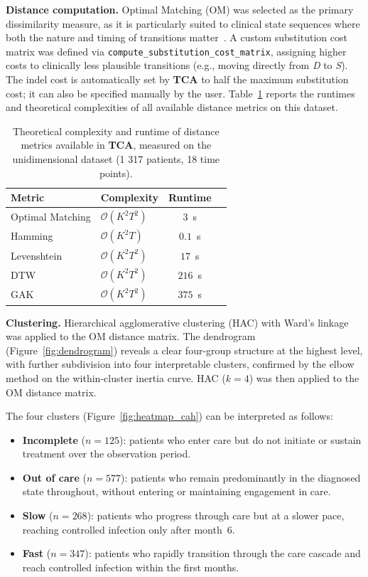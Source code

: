 \documentclass[pdflatex,sn-mathphys-num,referee,lineno]{sn-jnl}
\newcommand{\code}[1]{\texttt{#1}}
\newcommand{\pkg}[1]{\textbf{#1}}
\begin{document}
\textbf{Distance computation.}
Optimal Matching (OM) was selected as the primary dissimilarity measure, as it is particularly suited to clinical state sequences where both the nature and timing of transitions matter~\cite{andjohn1986optimal}.
A custom substitution cost matrix was defined via \code{compute\_substitution\_cost\_matrix}, assigning higher costs to clinically less plausible transitions (e.g., moving directly from \textit{D} to \textit{S}).
The indel cost is automatically set by \pkg{TCA} to half the maximum substitution cost; it can also be specified manually by the user.
Table~\ref{tab:runtimes} reports the runtimes and theoretical complexities of all available distance metrics on this dataset.

\begin{table}[htbp]
\centering
\caption{Theoretical complexity and runtime  of distance metrics available in \pkg{TCA}, measured on the unidimensional dataset (1 317 patients, 18 time points).}
\label{tab:runtimes}
\begin{tabular}{llcc}
\hline
\textbf{Metric} & \textbf{Complexity} & \textbf{Runtime} \\
\hline
Optimal Matching & $\mathcal{O}(K^2 T^2)$ & $3$~s \\
Hamming & $\mathcal{O}(K^2 T)$ &  $0.1$~s  \\
Levenshtein & $\mathcal{O}(K^2 T^2)$ & $17$~s \\
DTW & $\mathcal{O}(K^2 T^2)$ & $216$~s \\
GAK & $\mathcal{O}(K^2 T^2)$ & $375$~s \\
\hline
\end{tabular}
\end{table}

\FloatBarrier

\textbf{Clustering.}
Hierarchical agglomerative clustering (HAC) with Ward's linkage was applied to the OM distance matrix.
The dendrogram (Figure~\ref{fig:dendrogram}) reveals a clear four-group structure at the highest level, with further subdivision into four interpretable clusters, confirmed by the elbow method on the within-cluster inertia curve.
HAC ($k = 4$) was then applied to the OM distance matrix.

The four clusters (Figure~\ref{fig:heatmap_cah}) can be interpreted as follows:

\begin{itemize}
    \item \textbf{Incomplete} ($n = 125$): patients who enter care but do not initiate or sustain treatment over the observation period.
    \item \textbf{Out of care} ($n = 577$): patients who remain predominantly in the diagnosed state throughout, without entering or maintaining engagement in care.
    \item \textbf{Slow} ($n = 268$): patients who progress through care but at a slower pace, reaching controlled infection only after month~6.
    \item \textbf{Fast} ($n = 347$): patients who rapidly transition through the care cascade and reach controlled infection within the first months.
\end{itemize}
\end{document}
